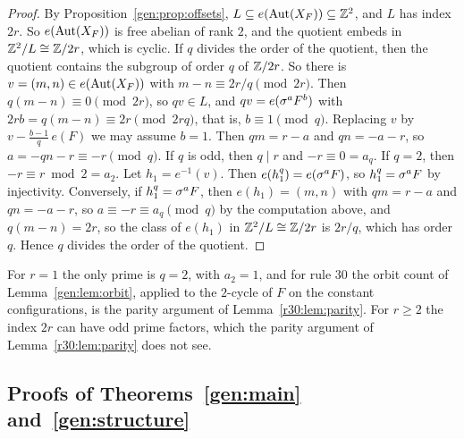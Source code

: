 \begin{proof}
By Proposition~\ref{gen:prop:offsets}, $L\subseteq e(\operatorname{Aut}(X_F))\subseteq\mathbb{Z}^2$, and $L$ has index $2r$. So $e(\operatorname{Aut}(X_F))$ is free abelian of rank $2$, and the quotient embeds in $\mathbb{Z}^2/L\cong\mathbb{Z}/2r$, which is cyclic. If $q$ divides the order of the quotient, then the quotient contains the subgroup of order $q$ of $\mathbb{Z}/2r$. So there is $v=(m,n)\in e(\operatorname{Aut}(X_F))$ with $m-n\equiv2r/q\pmod{2r}$. Then $q(m-n)\equiv0\pmod{2r}$, so $qv\in L$, and $qv=e(\sigma^aF^b)$ with $2rb=q(m-n)\equiv2r\pmod{2rq}$, that is, $b\equiv1\pmod q$. Replacing $v$ by $v-\frac{b-1}q\,e(F)$ we may assume $b=1$. Then $qm=r-a$ and $qn=-a-r$, so $a=-qn-r\equiv-r\pmod q$. If $q$ is odd, then $q\mid r$ and $-r\equiv0=a_q$. If $q=2$, then $-r\equiv r\bmod 2=a_2$. Let $h_1=e^{-1}(v)$. Then $e(h_1^q)=e(\sigma^aF)$, so $h_1^q=\sigma^aF$ by injectivity. Conversely, if $h_1^q=\sigma^aF$, then $e(h_1)=(m,n)$ with $qm=r-a$ and $qn=-a-r$, so $a\equiv-r\equiv a_q\pmod q$ by the computation above, and $q(m-n)=2r$, so the class of $e(h_1)$ in $\mathbb{Z}^2/L\cong\mathbb{Z}/2r$ is $2r/q$, which has order $q$. Hence $q$ divides the order of the quotient.
\end{proof}

For $r=1$ the only prime is $q=2$, with $a_2=1$, and for rule $30$ the orbit count of Lemma~\ref{gen:lem:orbit}, applied to the $2$-cycle of $F$ on the constant configurations, is the parity argument of Lemma~\ref{r30:lem:parity}. For $r\ge2$ the index $2r$ can have odd prime factors, which the parity argument of Lemma~\ref{r30:lem:parity} does not see.

\subsection{Proofs of Theorems~\ref{gen:main} and~\ref{gen:structure}}\label{gen:sec:proofs}

